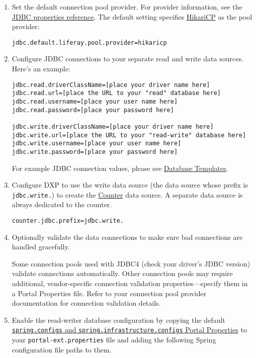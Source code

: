 \begin{enumerate}
\def\labelenumi{\arabic{enumi}.}
\item
  Set the default connection pool provider. For provider information,
  see the
  \href{https://docs.liferay.com/portal/7.2-latest/propertiesdoc/portal.properties.html\#JDBC}{JDBC
  properties reference}. The default setting specifies
  \href{https://github.com/brettwooldridge/HikariCP}{HikariCP} as the
  pool provider:

\begin{verbatim}
jdbc.default.liferay.pool.provider=hikaricp
\end{verbatim}
\item
  Configure JDBC connections to your separate read and write data
  sources. Here's an example:

\begin{verbatim}
jdbc.read.driverClassName=[place your driver name here]
jdbc.read.url=[place the URL to your "read" database here]
jdbc.read.username=[place your user name here]
jdbc.read.password=[place your password here]

jdbc.write.driverClassName=[place your driver name here]
jdbc.write.url=[place the URL to your "read-write" database here]
jdbc.write.username=[place your user name here]
jdbc.write.password=[place your password here]
\end{verbatim}

  For example JDBC connection values, please see
  \href{/docs/7-2/deploy/-/knowledge_base/d/database-templates}{Database
  Templates}.
\item
  Configure DXP to use the write data source (the data source whose
  prefix is \texttt{jdbc.write.}) to create the
  \href{https://docs.liferay.com/portal/7.2-latest/propertiesdoc/portal.properties.html\#Counter}{Counter}
  data source. A separate data source is always dedicated to the
  counter.

\begin{verbatim}
counter.jdbc.prefix=jdbc.write.
\end{verbatim}
\item
  Optionally validate the data connections to make sure bad connections
  are handled gracefully.

  Some connection pools used with JDBC4 (check your driver's JDBC
  version) validate connections automatically. Other connection pools
  may require additional, vendor-specific connection validation
  properties---specify them in a Portal Properties file. Refer to your
  connection pool provider documentation for connection validation
  details.
\item
  Enable the read-writer database configuration by copying the default
  \href{https://docs.liferay.com/portal/7.2-latest/propertiesdoc/portal.properties.html\#Spring}{\texttt{spring.configs}
  and \texttt{spring.infrastructure.configs} Portal Properties} to your
  \texttt{portal-ext.properties} file and adding the following Spring
  configuration file paths to them.


\end{enumerate}

